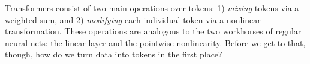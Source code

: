 
Transformers consist of two main operations over tokens: 1) \textit{mixing} tokens via a weighted sum, and 2) \textit{modifying} each individual token via a nonlinear transformation. These operations are analogous to the two workhorses of regular neural nets: the linear layer and the pointwise nonlinearity. Before we get to that, though, how do we turn data into tokens in the first place?

